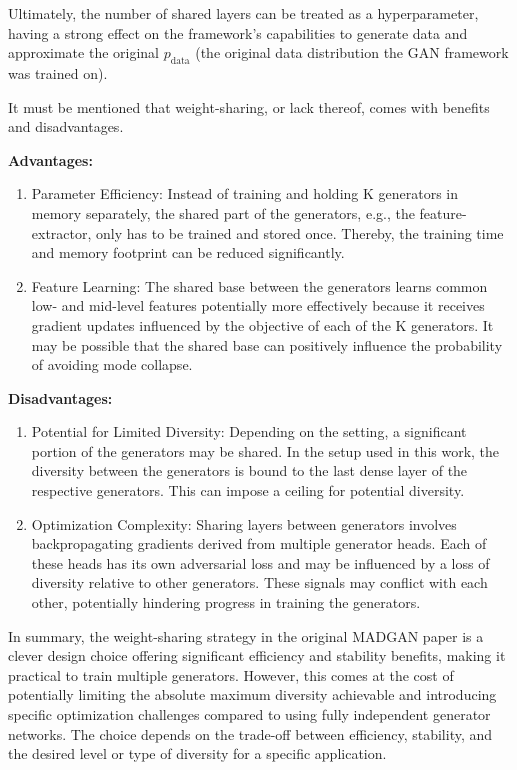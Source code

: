 Ultimately, the number of shared layers can be treated as a hyperparameter, having a strong effect on the framework's capabilities to generate data and approximate the original \(p_{\text{data}}\) (the original data distribution the GAN framework was trained on).

It must be mentioned that weight-sharing, or lack thereof, comes with benefits and disadvantages.

\noindent\textbf{Advantages:}
\begin{enumerate}
\item Parameter Efficiency: Instead of training and holding K generators in memory separately, the shared part of the generators, e.g., the feature-extractor, only has to be trained and stored once. Thereby, the training time and memory footprint can be reduced significantly.
\item Feature Learning: The shared base between the generators learns common low- and mid-level features potentially more effectively because it receives gradient updates influenced by the objective of each of the K generators. It may be possible that the shared base can positively influence the probability of avoiding mode collapse.
\end{enumerate}

\noindent\textbf{Disadvantages:}
\begin{enumerate}
\item Potential for Limited Diversity: Depending on the setting, a significant portion of the generators may be shared. In the setup used in this work, the diversity between the generators is bound to the last dense layer of the respective generators. This can impose a ceiling for potential diversity.
\item Optimization Complexity: Sharing layers between generators involves backpropagating gradients derived from multiple generator heads. Each of these heads has its own adversarial loss and may be influenced by a loss of diversity relative to other generators. These signals may conflict with each other, potentially hindering progress in training the generators.
\end{enumerate}

In summary, the weight-sharing strategy in the original MADGAN paper is a clever design choice offering significant efficiency and stability benefits, making it practical to train multiple generators. However, this comes at the cost of potentially limiting the absolute maximum diversity achievable and introducing specific optimization challenges compared to using fully independent generator networks. The choice depends on the trade-off between efficiency, stability, and the desired level or type of diversity for a specific application.

\newpage